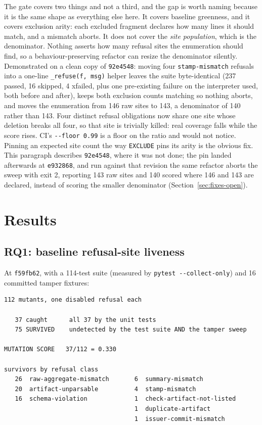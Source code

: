 \documentclass[11pt]{article}
\begin{document}
The gate covers two things and not a third, and the gap is worth naming because it is the
same shape as everything else here. It covers baseline greenness, and it covers exclusion
arity: each excluded fragment declares how many lines it should match, and a mismatch aborts.
It does not cover the \emph{site population}, which is the denominator. Nothing asserts how
many refusal sites the enumeration should find, so a behaviour-preserving refactor can resize
the denominator silently. Demonstrated on a clean copy of \texttt{92e4548}: moving four
\texttt{stamp-mismatch} refusals into a one-line \texttt{\_refuse(f, msg)} helper leaves the
suite byte-identical (237 passed, 16 skipped, 4 xfailed, plus one pre-existing failure on the
interpreter used, both before and after), keeps both exclusion counts matching so nothing
aborts, and moves the enumeration from 146 raw sites to 143, a denominator of 140 rather than
143. Four distinct refusal obligations now share one site whose deletion breaks all four, so
that site is trivially killed: real coverage falls while the score rises. CI's
\texttt{-{}-floor 0.99} is a floor on the ratio and would not notice. Pinning an expected site
count the way \texttt{EXCLUDE} pins its arity is the obvious fix. This paragraph describes
\texttt{92e4548}, where it was not done; the pin landed afterwards at \texttt{e932868}, and run
against that revision the same refactor aborts the sweep with exit 2, reporting 143 raw sites
and 140 scored where 146 and 143 are declared, instead of scoring the smaller denominator
(Section~\ref{sec:fixes-open}).

\section{Results}
\label{sec:results}

\subsection{RQ1: baseline refusal-site liveness}
\label{sec:rq1}

At \texttt{f59fb62}, with a 114-test suite (measured by \texttt{pytest -{}-collect-only}) and
16 committed tamper fixtures:

\begin{Verbatim}[frame=single,fontsize=\small]
112 mutants, one disabled refusal each

   37 caught      all 37 by the unit tests
   75 SURVIVED    undetected by the test suite AND the tamper sweep

MUTATION SCORE   37/112 = 0.330

survivors by refusal class
   26  raw-aggregate-mismatch       6  summary-mismatch
   20  artifact-unparsable          4  stamp-mismatch
   16  schema-violation             1  check-artifact-not-listed
                                    1  duplicate-artifact
                                    1  issuer-commit-mismatch
\end{Verbatim}
\end{document}
